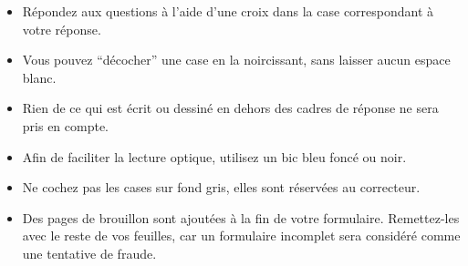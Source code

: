 \documentclass[11pt,french,a4paper]{article}
\begin{document}
{  \noindent\hrulefill{}
  \begin{itemize}[nosep]
    \item Répondez aux questions à l'aide d'une croix dans la case correspondant à votre réponse.
    \item Vous pouvez \enquote{décocher} une case en la noircissant, sans laisser aucun espace blanc.
    \item Rien de ce qui est écrit ou dessiné en dehors des cadres de réponse ne sera pris en compte.
    \item Afin de faciliter la lecture optique, utilisez un bic bleu foncé ou noir.
    \item Ne cochez pas les cases sur fond gris, elles sont réservées au correcteur.
    \item Des pages de brouillon sont ajoutées à la fin de votre formulaire.
          Remettez-les avec le reste de vos feuilles, car un formulaire incomplet sera considéré comme une tentative de fraude.
  \end{itemize}
  \noindent\hrulefill{}
  \vspace*{1.5em}





  \AMCcleardoublepage{}
}
\end{document}
